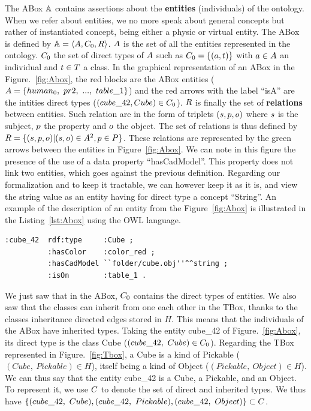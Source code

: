 The ABox $\mathbb{A}$ contains assertions about the \textbf{entities} (individuals) of the ontology. When we refer about entities, we no more speak about general concepts but rather of instantiated concept, being either a physic or virtual entity. The ABox is defined by $\mathbb{A} = \langle A, C_0, R \rangle$. $A$ is the set of all the entities represented in the ontology. $C_0$ the set of direct types of $A$ such as $C_0 = \{(a, t) \}$ with $a \in A$ an individual and $t \in T$ a class. In the graphical representation of an ABox in the Figure.~\ref{fig:Abox}, the red blocks are the ABox entities ($\indivset = \{human_0,\ pr2,\ ...,\ table\_1\}$) and the red arrows with the label ``isA'' are the intities direct types ($(cube\_42, Cube) \in C_0$).
$R$ is finally the set of \textbf{relations} between entities. Such relation are in the form of triplets $(s, p ,o)$ where $s$ is the subject, $p$ the property and $o$ the object. The set of relations is thus defined by $R = \{(s, p ,o) | (s, o) \in A^2, p \in P\}$. These relations are represented by the green arrows between the entities in Figure~\ref{fig:Abox}. We can note in this figure the presence of the use of a data property ``hasCadModel''. This property does not link two entities, which goes against the previous definition. Regarding our formalization and to keep it tractable, we can however keep it as it is, and view the string value as an entity having for direct type a concept ``String''. An example of the description of an entity from the Figure~\ref{fig:Abox} is illustrated in the Listing~\ref{lst:Abox} using the OWL language.

\begin{lstlisting}[frame=single, basicstyle=\scriptsize\ttfamily, label={lst:Abox}, caption={Description of an ontology individual in the OWL language using the Turle syntax.},captionpos=b, style=OwlTurtle_indiv]
:cube_42  rdf:type     :Cube ;
          :hasColor    :color_red ;
          :hasCadModel ``folder/cube.obj''^^string ;
          :isOn        :table_1 .
\end{lstlisting}

We just saw that in the ABox, $C_0$ contains the direct types of entities. We also saw that the classes can inherit from one each other in the TBox, thanks to the classes inheritance directed edges stored in $H$. This means that the individuals of the ABox have inherited types. Taking the entity cube\_42 of Figure.~\ref{fig:Abox}, its direct type is the class Cube ($(cube\_42,\ Cube) \in \inheritset_0$). Regarding the TBox represented in Figure.~\ref{fig:Tbox}, a Cube is a kind of Pickable ($(Cube,\ Pickable) \in H$), itself being a kind of Object ($(Pickable,\ Object) \in H$). We can thus say that the entity cube\_42 is a Cube, a Pickable, and an Object. To represent it, we use $C$ to denote the set of direct and inherited types. We thus have $\{ (cube\_42,\ Cube), (cube\_42,\ Pickable), (cube\_42,\ Object)\} \subset \inheritset$.

